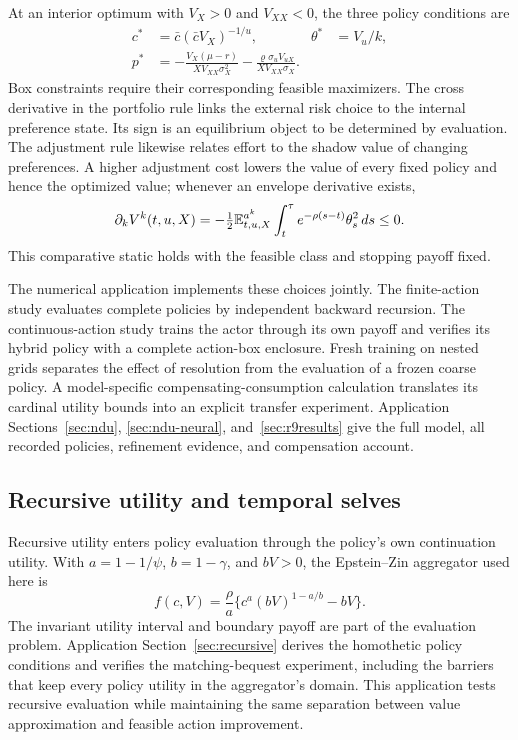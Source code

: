 At an interior optimum with $V_X>0$ and $V_{XX}<0$, the three policy conditions are
\begin{align}
 c^*&=\bar c(\bar c V_X)^{-1/u}, &
 \theta^*&=V_u/k,\nonumber\\
 p^*&=-\frac{V_X(\mu-r)}{XV_{XX}\sigma_X^2}
       -\frac{\varrho\sigma_u V_{uX}}{XV_{XX}\sigma_X}.\label{eq:scope-preference-policies}
\end{align}
Box constraints require their corresponding feasible maximizers. The cross derivative in the portfolio rule links the external risk choice to the internal preference state. Its sign is an equilibrium object to be determined by evaluation. The adjustment rule likewise relates effort to the shadow value of changing preferences. A higher adjustment cost lowers the value of every fixed policy and hence the optimized value; whenever an envelope derivative exists,
\begin{equation}\label{eq:scope-preference-envelope}
 \partial_k V^k(t,u,X)
 =-\tfrac12\mathbb E^{a^k}_{t,u,X}
   \int_t^\tau e^{-\rho(s-t)}\theta_s^2\,ds\leq0.
\end{equation}
This comparative static holds with the feasible class and stopping payoff fixed.

The numerical application implements these choices jointly. The finite-action study evaluates complete policies by independent backward recursion. The continuous-action study trains the actor through its own payoff and verifies its hybrid policy with a complete action-box enclosure. Fresh training on nested grids separates the effect of resolution from the evaluation of a frozen coarse policy. A model-specific compensating-consumption calculation translates its cardinal utility bounds into an explicit transfer experiment. Application Sections~\ref{sec:ndu}, \ref{sec:ndu-neural}, and~\ref{sec:r9results} give the full model, all recorded policies, refinement evidence, and compensation account.

\subsection{Recursive utility and temporal selves}
Recursive utility enters policy evaluation through the policy's own continuation utility. With $a=1-1/\psi$, $b=1-\gamma$, and $bV>0$, the Epstein--Zin aggregator used here is
\begin{equation}\label{eq:scope-recursive}
 f(c,V)=\frac\rho a\{c^a(bV)^{1-a/b}-bV\}.
\end{equation}
The invariant utility interval and boundary payoff are part of the evaluation problem. Application Section~\ref{sec:recursive} derives the homothetic policy conditions and verifies the matching-bequest experiment, including the barriers that keep every policy utility in the aggregator's domain. This application tests recursive evaluation while maintaining the same separation between value approximation and feasible action improvement.

